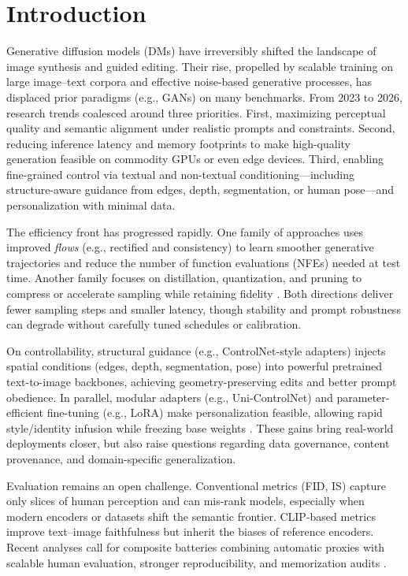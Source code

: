 \documentclass[conference]{IEEEtran}
\begin{document}
\section{Introduction}
Generative diffusion models (DMs) have irreversibly shifted the landscape of image synthesis and guided editing. Their rise, propelled by scalable training on large image--text corpora and effective noise-based generative processes, has displaced prior paradigms (e.g., GANs) on many benchmarks. From 2023 to 2026, research trends coalesced around three priorities. First, maximizing perceptual quality and semantic alignment under realistic prompts and constraints. Second, reducing inference latency and memory footprints to make high-quality generation feasible on commodity GPUs or even edge devices. Third, enabling fine-grained control via textual and non-textual conditioning---including structure-aware guidance from edges, depth, segmentation, or human pose---and personalization with minimal data.

The efficiency front has progressed rapidly. One family of approaches uses improved \emph{flows} (e.g., rectified and consistency) to learn smoother generative trajectories and reduce the number of function evaluations (NFEs) needed at test time. Another family focuses on distillation, quantization, and pruning to compress or accelerate sampling while retaining fidelity \cite{Lee2024RectifiedArxiv}. Both directions deliver fewer sampling steps and smaller latency, though stability and prompt robustness can degrade without carefully tuned schedules or calibration.

On controllability, structural guidance (e.g., ControlNet-style adapters) injects spatial conditions (edges, depth, segmentation, pose) into powerful pretrained text-to-image backbones, achieving geometry-preserving edits and better prompt obedience. In parallel, modular adapters (e.g., Uni-ControlNet) and parameter-efficient fine-tuning (e.g., LoRA) make personalization feasible, allowing rapid style/identity infusion while freezing base weights \cite{Zhang2023ControlNet,Zhao2023UniControlNet,Smith2024LoRADiffusion}. These gains bring real-world deployments closer, but also raise questions regarding data governance, content provenance, and domain-specific generalization.

Evaluation remains an open challenge. Conventional metrics (FID, IS) capture only slices of human perception and can mis-rank models, especially when modern encoders or datasets shift the semantic frontier. CLIP-based metrics improve text--image faithfulness but inherit the biases of reference encoders. Recent analyses call for composite batteries combining automatic proxies with scalable human evaluation, stronger reproducibility, and memorization audits \cite{Stein2023EvaluationFlaws}. 
\end{document}
